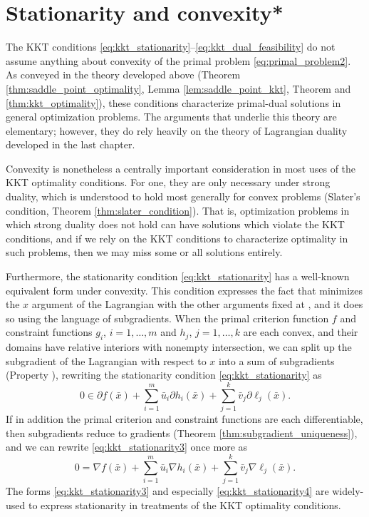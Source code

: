 \section{Stationarity and convexity*}

The KKT conditions \eqref{eq:kkt_stationarity}--\eqref{eq:kkt_dual_feasibility}
do not assume anything about convexity of the primal problem
\eqref{eq:primal_problem2}. As conveyed in the theory developed above (Theorem  
\ref{thm:saddle_point_optimality}, Lemma \ref{lem:saddle_point_kkt}, Theorem
and \ref{thm:kkt_optimality}), these conditions characterize primal-dual solutions
in general optimization problems. The arguments that underlie this theory are
elementary; however, they do rely heavily on the theory of Lagrangian duality
developed in the last chapter.   

Convexity is nonetheless a centrally important consideration in most uses of the
KKT optimality conditions. For one, they are only necessary under strong
duality, which is understood to hold most generally for convex problems
(Slater's condition, Theorem \ref{thm:slater_condition}). That is, optimization
problems in which strong duality does not hold can have solutions which violate  
the KKT conditions, and if we rely on the KKT conditions to characterize
optimality in such problems, then we may miss some or all solutions entirely.        

Furthermore, the stationarity condition \eqref{eq:kkt_stationarity} has a
well-known equivalent form under convexity. This condition expresses the fact
that  minimizes the $x$ argument of the Lagrangian with the
other arguments fixed at , and it does so using the
language of subgradients. When the primal criterion function $f$ and constraint
functions $g_i$, $i=1,\dots,m$ and $h_j$, $j=1,\dots,k$ are each convex, and
their domains have relative interiors with nonempty intersection, we can split
up the subgradient of the Lagrangian with respect to $x$ into a sum of
subgradients (Property ), rewriting the stationarity
condition \eqref{eq:kkt_stationarity} as   
\begin{equation}
\label{eq:kkt_stationarity3}
0 \in \partial f(\bar{x}) + \sum_{i=1}^m \bar{u}_i \partial h_i(\bar{x}) +
\sum_{j=1}^k \bar{v}_j \partial \ell_j(\bar{x}).
\end{equation}
If in addition the primal criterion and constraint functions are each
differentiable, then subgradients reduce to gradients (Theorem
\ref{thm:subgradient_uniqueness}), and we can rewrite  
\eqref{eq:kkt_stationarity3} once more as  
\begin{equation}
\label{eq:kkt_stationarity4}
0 = \nabla f(\bar{x}) + \sum_{i=1}^m \bar{u}_i \nabla h_i(\bar{x}) +
\sum_{j=1}^k \bar{v}_j \nabla \ell_j(\bar{x}).
\end{equation}
The forms \eqref{eq:kkt_stationarity3} and especially
\eqref{eq:kkt_stationarity4} are widely-used to express stationarity in
treatments of the KKT optimality conditions.  

